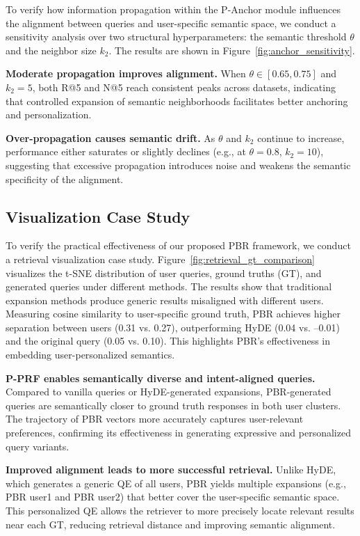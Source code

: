 To verify how information propagation within the P-Anchor module influences the alignment between queries and user-specific semantic space, we conduct a sensitivity analysis over two structural hyperparameters: the semantic threshold $\theta$ and the neighbor size $k_2$. The results are shown in Figure~\ref{fig:anchor_sensitivity}.

\textbf{Moderate propagation improves alignment.} When $\theta \in [0.65, 0.75]$ and $k_2 = 5$, both R@5 and N@5 reach consistent peaks across datasets, indicating that controlled expansion of semantic neighborhoods facilitates better anchoring and personalization.

\textbf{Over-propagation causes semantic drift.} As $\theta$ and $k_2$ continue to increase, performance either saturates or slightly declines (e.g., at $\theta=0.8$, $k_2=10$), suggesting that excessive propagation introduces noise and weakens the semantic specificity of the alignment.

\subsection{Visualization Case Study}

To verify the practical effectiveness of our proposed PBR framework, we conduct a retrieval visualization case study.
Figure~\ref{fig:retrieval_gt_comparison} visualizes the t-SNE distribution of user queries, ground truths (GT), and generated queries under different methods.
The results show that traditional expansion methods produce generic results misaligned with different users.
Measuring cosine similarity to user-specific ground truth, PBR achieves higher separation between users (0.31 vs. 0.27), outperforming HyDE (0.04 vs. –0.01) and the original query (0.05 vs. 0.10). This highlights PBR’s effectiveness in embedding user-personalized semantics.

\textbf{P-PRF enables semantically diverse and intent-aligned queries.}
Compared to vanilla queries or HyDE-generated expansions, PBR-generated queries are semantically closer to ground truth responses in both user clusters.
The trajectory of PBR vectors more accurately captures user-relevant preferences, confirming its effectiveness in generating expressive and personalized query variants.

\textbf{Improved alignment leads to more successful retrieval.}
Unlike HyDE, which generates a generic QE of all users, PBR yields multiple expansions (e.g., PBR user1 and PBR user2) that better cover the user-specific semantic space.
This personalized QE allows the retriever to more precisely locate relevant results near each GT, reducing retrieval distance and improving semantic alignment.


\FloatBarrier